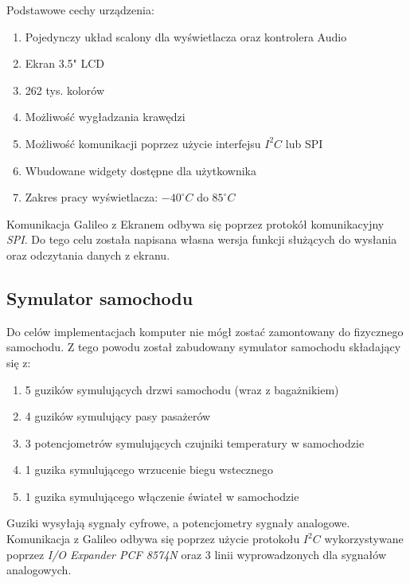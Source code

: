 \documentclass{xmgr}
\begin{document}
Podstawowe cechy urządzenia\cite{FTDI}:
\begin{enumerate}
	\item Pojedynczy układ scalony dla wyświetlacza oraz kontrolera Audio
	\item Ekran 3.5" LCD
	\item 262 tys. kolorów
	\item Możliwość wygładzania krawędzi
	\item Możliwość komunikacji poprzez użycie interfejsu $I^2C$ lub SPI
	\item Wbudowane widgety dostępne dla użytkownika
	\item Zakres pracy wyświetlacza: $-40^{\circ} C$ do $85^{\circ} C$ 
\end{enumerate}

Komunikacja Galileo z Ekranem odbywa się poprzez protokół komunikacyjny \emph{SPI}. Do tego celu została napisana własna wersja funkcji służących do wysłania oraz odczytania danych z ekranu.

\subsection{Symulator samochodu}
Do celów implementacjach komputer nie mógł zostać zamontowany do fizycznego samochodu. Z tego powodu został zabudowany symulator samochodu składający się z:
\begin{enumerate}
	\item 5 guzików symulujących drzwi samochodu (wraz z bagażnikiem)
	\item 4 guzików symulujący pasy pasażerów
	\item 3 potencjometrów symulujących czujniki temperatury w samochodzie
	\item 1 guzika symulującego wrzucenie biegu wstecznego
	\item 1 guzika symulującego włączenie świateł w samochodzie
\end{enumerate}
Guziki wysyłają sygnały cyfrowe, a potencjometry sygnały analogowe. Komunikacja z Galileo odbywa się poprzez użycie protokołu $I^2C$ wykorzystywane poprzez \emph{I/O Expander PCF 8574N} oraz 3 linii wyprowadzonych dla sygnałów analogowych.

\end{document}
